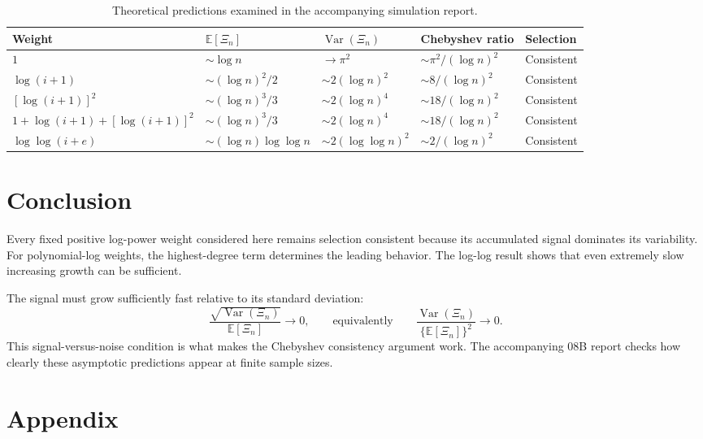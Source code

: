 \documentclass[11pt]{article}
\begin{document}
\begin{table}[H]
\centering
\footnotesize
\setlength{\tabcolsep}{3pt}
\begin{tabular}{@{}>{\raggedright\arraybackslash}p{3.0cm}
>{\raggedright\arraybackslash}p{2.8cm}
>{\raggedright\arraybackslash}p{2.8cm}
>{\raggedright\arraybackslash}p{3.0cm}
>{\raggedright\arraybackslash}p{1.7cm}@{}}
\toprule
Weight & $\mathbb E[\Xi_n]$ & $\operatorname{Var}(\Xi_n)$
& Chebyshev ratio & Selection \\
\midrule
$1$ & $\sim\log n$ & $\to\pi^2$ & $\sim\pi^2/(\log n)^2$ & Consistent \\
$\log(i+1)$ & $\sim(\log n)^2/2$ & $\sim2(\log n)^2$
& $\sim8/(\log n)^2$ & Consistent \\
$[\log(i+1)]^2$ & $\sim(\log n)^3/3$ & $\sim2(\log n)^4$
& $\sim18/(\log n)^2$ & Consistent \\
$1+\log(i+1)+[\log(i+1)]^2$ & $\sim(\log n)^3/3$
& $\sim2(\log n)^4$ & $\sim18/(\log n)^2$ & Consistent \\
$\log\log(i+e)$ & $\sim(\log n)\log\log n$
& $\sim2(\log\log n)^2$ & $\sim2/(\log n)^2$ & Consistent \\
\bottomrule
\end{tabular}
\caption{Theoretical predictions examined in the accompanying simulation report.}
\end{table}

\section{Conclusion}

Every fixed positive log-power weight considered here remains selection
consistent because its accumulated signal dominates its variability.  For
polynomial-log weights, the highest-degree term determines the leading
behavior.  The log-log result shows that even extremely slow increasing
growth can be sufficient.

The signal must grow sufficiently fast relative to its standard deviation:
\[
\frac{\sqrt{\operatorname{Var}(\Xi_n)}}{\mathbb E[\Xi_n]}\longrightarrow0,
\qquad\text{equivalently}\qquad
\frac{\operatorname{Var}(\Xi_n)}{\{\mathbb E[\Xi_n]\}^2}\longrightarrow0.
\]
This signal-versus-noise condition is what makes the Chebyshev consistency
argument work.  The accompanying 08B report checks how clearly these
asymptotic predictions appear at finite sample sizes.

\clearpage
\appendix
\section*{Appendix}
\end{document}
